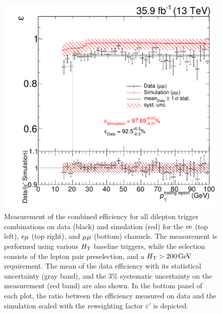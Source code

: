 \begin{figure}[htb]
 \includegraphics[width=\pairwidth]{figures/triggerStudies/efficiency_dataHT_trigDilep_MM_pt2}
 \caption{Measurement of the combined efficiency for all dilepton trigger combinations on data (black) and simulation (red) for the $\mathrm{e}\mathrm{e}$ (top left), $\mathrm{e}\mu$ (top right), and $\mu\mu$ (bottom) channels. The measurement is performed using various $H_{\mathrm{T}}$ baseline triggers, while the selection consists of the lepton pair preselection, and a $H_{\mathrm{T}}>200\,\text{Ge\hspace{-.08em}V}$ requirement. The mean of the data efficiency with its statistical uncertainty (gray band), and the $3\%$ systematic uncertainty on the measurement (red band) are also shown. In the bottom panel of each plot, the ratio between the efficiency measured on data and the simulation scaled with the reweighting factor $\varepsilon'$ is depicted.}
 \label{fig:triggEff}
\end{figure}


